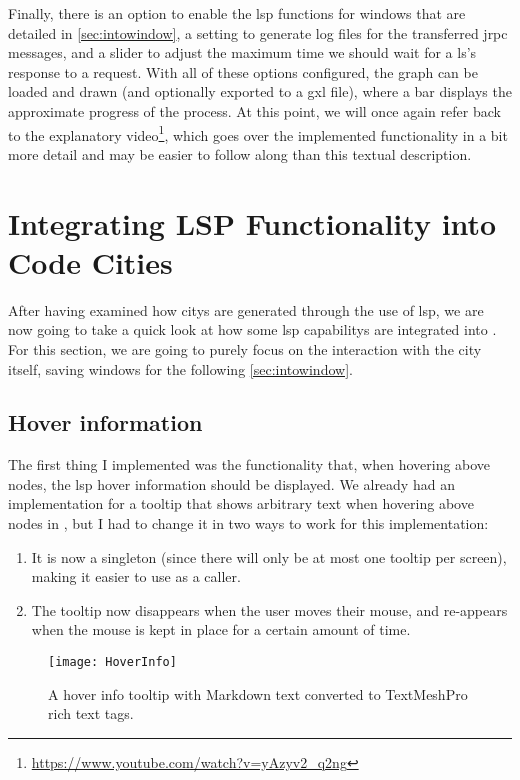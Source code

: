\documentclass[../thesis]{subfiles}
\begin{document}
Finally, there is an option to enable the \gls{lsp} functions for \glspl{window} that are detailed in \cref{sec:intowindow}, a setting to generate log files for the transferred \gls{jrpc} messages, and a slider to adjust the maximum time we should wait for a \gls{ls}'s response to a request.
With all of these options configured, the graph can be loaded and drawn (and optionally exported to a \gls{gxl} file), where a bar displays the approximate progress of the process.
At this point, we will once again refer back to the explanatory video\footnote{\url{https://www.youtube.com/watch?v=yAzyv2_q2ng}},
which goes over the implemented functionality in a bit more detail and may be easier to follow along than this textual description.

\section{Integrating LSP Functionality into Code Cities}\label{sec:intocity}
After having examined how \glspl{city} are generated through the use of \gls{lsp}, we are now going to take a quick look at how some \gls{lsp} \glspl{capability} are integrated into \SEE{}.
For this section, we are going to purely focus on the interaction with the city itself, saving \glspl{window} for the following \cref{sec:intowindow}.

\subsection{Hover information}
The first thing I implemented was the functionality that, when hovering above nodes, the \gls{lsp} hover information should be displayed.
We already had an implementation for a tooltip that shows arbitrary text when hovering above nodes in \SEE{}, but I had to change it in two ways to work for this implementation:
\begin{enumerate}
	\item It is now a \gls{singleton} (since there will only be at most one tooltip per screen), making it easier to use as a caller.
	\item The tooltip now disappears when the user moves their mouse, and re-appears when the mouse is kept in place for a certain amount of time.
\end{enumerate}

\begin{figure}
	\begin{center}
		\texttt{[image: HoverInfo]}
	\end{center}
	\caption{A hover info tooltip with Markdown text converted to TextMeshPro rich text tags.}\label{fig:hoverinfo}
\end{figure}
\end{document}

